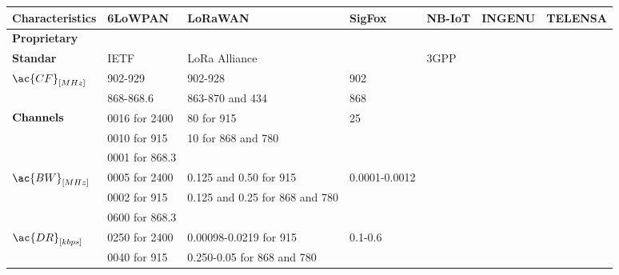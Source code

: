 \begin{table}[!ht]
\scriptsize
	\begin{tabulary}{\textwidth}{L|L|L|L|L|L|L}
	\bf{Characteristics}               & \bf{6LoWPAN}   & \bf{LoRaWAN}                    & \bf{SigFox}   & \bf{NB-IoT} & \textbf{INGENU} & \textbf{TELENSA}\\\hline
	\bf{Proprietary}                   &                &                                 & \ok           &             &                 &                 \\\hline
	\bf{Standar}                       & IETF           & LoRa Alliance                   &               & 3GPP        &                 &                 \\\hline
	 & 902-929        & 902-928                         & 902           &             &                 &                 \\
	\                                  & 868-868.6      & 863-870 and 434                 & 868           &             &                 &                 \\\hline
	  & 0016 for 2400  & 80             for 915          & 25            &             &                 &                 \\
	\                                  & 0010 for 915   & 10             for 868 and 780  &               &             &                 &                 \\
	\                                  & 0001 for 868.3 &                                 &               &             &                 &                 \\\hline
	 & 0005 for 2400  & 0.125 and 0.50 for 915          & 0.0001-0.0012 &             &                 &                 \\
	\                                  & 0002 for 915   & 0.125 and 0.25 for 868 and 780  &               &             &                 &                 \\
	\                                  & 0600 for 868.3 &                                 &               &             &                 &                 \\\hline
	& 0250 for 2400  & 0.00098-0.0219 for 915          & 0.1-0.6       &             &                 &                 \\
	\                                  & 0040 for 915   & 0.250-0.05     for 868 and 780  &               &             &                 &                 \\

\end{tabulary}
\end{table}
